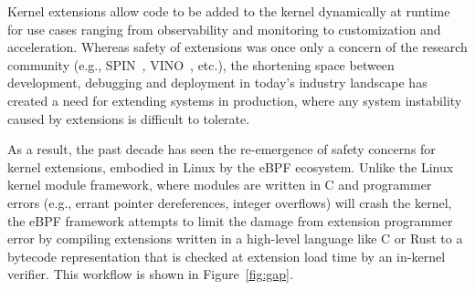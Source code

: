 



Kernel extensions allow code to be added to the kernel dynamically at
runtime for use cases ranging from observability and monitoring to
customization and acceleration.  Whereas safety of extensions was once
only a concern of the research community (e.g., SPIN~\cite{spin},
VINO~\cite{vino}, etc.), the shortening space between development,
debugging and deployment in today's industry landscape has created a
need for extending systems in production, where any system instability
caused by extensions is difficult to tolerate.

As a result, the past decade has seen the re-emergence of safety
concerns for kernel extensions, embodied in Linux by the eBPF
ecosystem.  Unlike the Linux kernel module framework, where modules
are written in C and programmer errors (e.g., errant pointer
dereferences, integer overflows) will crash the kernel, the eBPF
framework attempts to limit the damage from extension programmer error
by compiling extensions written in a high-level language like C or
Rust to a bytecode representation that is checked at extension load
time by an in-kernel verifier.  This workflow is shown in
Figure~\ref{fig:gap}.


